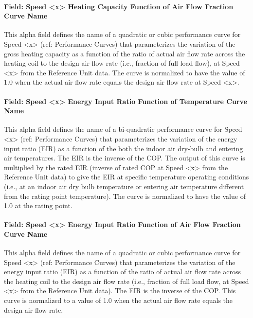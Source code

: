 \paragraph{Field: Speed \textless{}x\textgreater{} Heating Capacity Function of Air Flow Fraction Curve Name}\label{field-speed-x-heating-capacity-function-of-air-flow-fraction-curve-name}

This alpha field defines the name of a quadratic or cubic performance curve for Speed \textless{}x\textgreater{} (ref: Performance Curves) that parameterizes the variation of the gross heating capacity as a function of the ratio of actual air flow rate across the heating coil to the design air flow rate (i.e., fraction of full load flow), at Speed \textless{}x\textgreater{} from the Reference Unit data. The curve is normalized to have the value of 1.0 when the actual air flow rate equals the design air flow rate at Speed \textless{}x\textgreater{}.

\paragraph{Field: Speed \textless{}x\textgreater{} Energy Input Ratio Function of Temperature Curve Name}\label{field-speed-x-energy-input-ratio-function-of-temperature-curve-name-3}

This alpha field defines the name of a bi-quadratic performance curve for Speed \textless{}x\textgreater{} (ref: Performance Curves) that parameterizes the variation of the energy input ratio (EIR) as a function of the both the indoor air dry-bulb and entering air temperatures. The EIR is the inverse of the COP. The output of this curve is multiplied by the rated EIR (inverse of rated COP at Speed \textless{}x\textgreater{} from the Reference Unit data) to give the EIR at specific temperature operating conditions (i.e., at an indoor air dry bulb temperature or entering air temperature different from the rating point temperature). The curve is normalized to have the value of 1.0 at the rating point.

\paragraph{Field: Speed \textless{}x\textgreater{} Energy Input Ratio Function of Air Flow Fraction Curve Name}\label{field-speed-x-energy-input-ratio-function-of-air-flow-fraction-curve-name-1}

This alpha field defines the name of a quadratic or cubic performance curve for Speed \textless{}x\textgreater{} (ref: Performance Curves) that parameterizes the variation of the energy input ratio (EIR) as a function of the ratio of actual air flow rate across the heating coil to the design air flow rate (i.e., fraction of full load flow, at Speed \textless{}x\textgreater{} from the Reference Unit data). The EIR is the inverse of the COP. This curve is normalized to a value of 1.0 when the actual air flow rate equals the design air flow rate.

